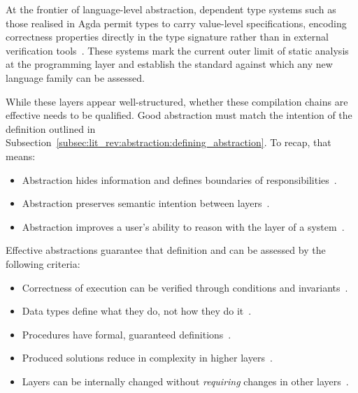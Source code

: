 At the frontier of language-level abstraction, dependent type systems such as those realised in Agda permit types to carry value-level specifications, encoding correctness properties directly in the type signature rather than in external verification tools~\cite{norell2009dependently}.
These systems mark the current outer limit of static analysis at the programming layer and establish the standard against which any new language family can be assessed.

While these layers appear well-structured, whether these compilation chains are effective needs to be qualified.
Good abstraction must match the intention of the definition outlined in Subsection~\ref{subsec:lit_rev:abstraction:defining_abstraction}.
To recap, that means:
\begin{itemize}
    \item Abstraction hides information and defines boundaries of responsibilities~\cite{parnas1972criteria}.
    \item Abstraction preserves semantic intention between layers~\cite{yuan2025foundationalabstractions}.
    \item Abstraction improves a user's ability to reason with the layer of a system~\cite{DiMatteo2024AbstractionHierarchy}.
\end{itemize}

Effective abstractions guarantee that definition and can be assessed by the following criteria:
\begin{itemize}
    \item Correctness of execution can be verified through conditions and invariants~\cite{yuan2025foundationalabstractions, LiskovGuttag1986}.
    \item Data types define what they do, not how they do it~\cite{LiskovGuttag1986}.
    \item Procedures have formal, guaranteed definitions~\cite{LiskovGuttag1986}.
    \item Produced solutions reduce in complexity in higher layers~\cite{aho2022abstractions,DiMatteo2024AbstractionHierarchy}.
    \item Layers can be internally changed without \textit{requiring} changes in other layers~\cite{parnas1972criteria}.
\end{itemize}

